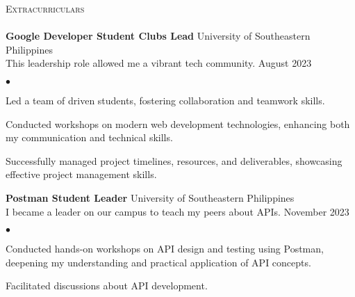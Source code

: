 \documentclass[a4paper]{article}
\newcommand{\lineunder} {
        \vspace*{-8pt} \\
        \hspace*{-18pt} \hrulefill \\
    }
\newcommand{\header} [1] {
        {\vspace*{4mm} \hspace*{-18pt}\vspace*{8pt} \textsc{#1}}
        \vspace*{-6pt} \lineunder
    }
\newenvironment{achievements}{
        \begin{list}
            {$\bullet$}{\topsep 0pt \itemsep -2pt}}{\vspace*{4pt}
        \end{list}
    }
\begin{document}
\header{Extracurriculars}
\textbf{Google Developer Student Clubs Lead} \hfill University of Southeastern Philippines\\
\vspace{1mm}
This leadership role allowed me a vibrant tech community. \hfill August 2023\\
\begin{achievements}
    \item Led a team of driven students, fostering collaboration and teamwork skills.
    \item Conducted workshops on modern web development technologies, enhancing both my communication and technical skills.
    \item Successfully managed project timelines, resources, and deliverables, showcasing effective project management skills.
\end{achievements}
\vspace*{2mm}
\textbf{Postman Student Leader} \hfill University of Southeastern Philippines\\
\vspace{1mm}
I became a leader on our campus to teach my peers about APIs. \hfill November 2023\\
\begin{achievements}
    \item Conducted hands-on workshops on API design and testing using Postman, deepening my understanding and practical application of API concepts.
    \item Facilitated discussions about API development.
\end{achievements}

    
\end{document}
